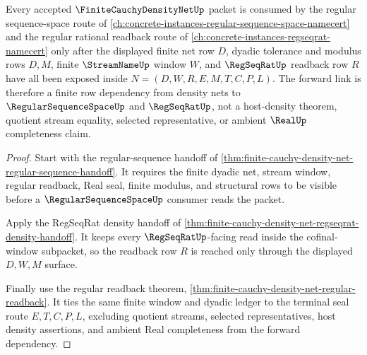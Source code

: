 \begin{theorem}
\label{thm:finite-cauchy-density-net-regular-sequence-forward-link}
Every accepted $\FiniteCauchyDensityNetUp$ packet is consumed by the regular sequence-space route of \autoref{ch:concrete-instances-regular-sequence-space-namecert} and the regular rational readback route of \autoref{ch:concrete-instances-regseqrat-namecert} only after the displayed finite net row $D$, dyadic tolerance and modulus rows $D,M$, finite $\StreamNameUp$ window $W$, and $\RegSeqRatUp$ readback row $R$ have all been exposed inside $N=(D,W,R,E,M,T,C,P,L)$. The forward link is therefore a finite row dependency from density nets to $\RegularSequenceSpaceUp$ and $\RegSeqRatUp$, not a host-density theorem, quotient stream equality, selected representative, or ambient $\RealUp$ completeness claim.
\end{theorem}
\begin{proof}
Start with the regular-sequence handoff of \autoref{thm:finite-cauchy-density-net-regular-sequence-handoff}. It requires the finite dyadic net, stream window, regular readback, Real seal, finite modulus, and structural rows to be visible before a $\RegularSequenceSpaceUp$ consumer reads the packet.

Apply the RegSeqRat density handoff of \autoref{thm:finite-cauchy-density-net-regseqrat-density-handoff}. It keeps every $\RegSeqRatUp$-facing read inside the cofinal-window subpacket, so the readback row $R$ is reached only through the displayed $D,W,M$ surface.

Finally use the regular readback theorem, \autoref{thm:finite-cauchy-density-net-regular-readback}. It ties the same finite window and dyadic ledger to the terminal seal route $E,T,C,P,L$, excluding quotient streams, selected representatives, host density assertions, and ambient Real completeness from the forward dependency.
\end{proof}

